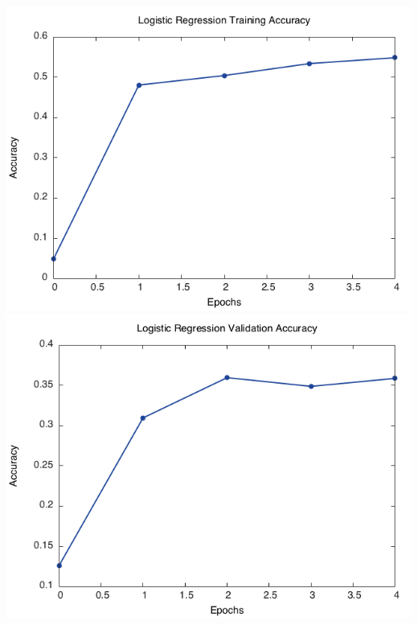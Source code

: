 \documentclass[11pt]{article}
\begin{document}
\includegraphics[scale=0.33]{lr_train_sst1}
\includegraphics[scale=0.33]{lr_valid_sst1} \\
\end{document}
